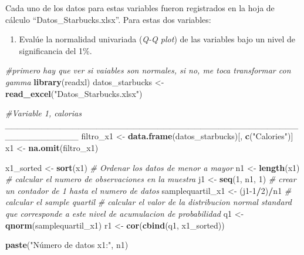 \documentclass[
]{article}
\newenvironment{Shaded}{\begin{snugshade}}{\end{snugshade}}
\newcommand{\CommentTok}[1]{\textcolor[rgb]{0.56,0.35,0.01}{\textit{#1}}}
\newcommand{\DecValTok}[1]{\textcolor[rgb]{0.00,0.00,0.81}{#1}}
\newcommand{\FunctionTok}[1]{\textcolor[rgb]{0.13,0.29,0.53}{\textbf{#1}}}
\newcommand{\NormalTok}[1]{#1}
\newcommand{\OtherTok}[1]{\textcolor[rgb]{0.56,0.35,0.01}{#1}}
\newcommand{\SpecialCharTok}[1]{\textcolor[rgb]{0.81,0.36,0.00}{\textbf{#1}}}
\newcommand{\StringTok}[1]{\textcolor[rgb]{0.31,0.60,0.02}{#1}}
\providecommand{\tightlist}{%
  \setlength{\itemsep}{0pt}\setlength{\parskip}{0pt}}
\begin{document}
Cada uno de los datos para estas variables fueron registrados en la hoja
de cálculo ``Datos\_Starbucks.xlsx''. Para estas dos variables:

\begin{enumerate}
\def\labelenumi{\arabic{enumi}.}
\tightlist
\item
  Evalúe la normalidad univariada (\emph{Q-Q plot}) de las variables
  bajo un nivel de significancia del 1\%.
\end{enumerate}

\begin{Shaded}
\begin{Highlighting}[]
\CommentTok{\#primero hay que ver si vaiables son normales, si no, me toca transformar con gamma}
\FunctionTok{library}\NormalTok{(readxl)}
\NormalTok{datos\_starbucks }\OtherTok{\textless{}{-}} \FunctionTok{read\_excel}\NormalTok{(}\StringTok{"Datos\_Starbucks.xlsx"}\NormalTok{)}


\CommentTok{\#Variable 1, calorias  \_\_\_\_\_\_\_\_\_\_\_\_\_\_\_\_\_\_\_\_\_\_\_\_\_\_\_\_\_\_\_\_\_\_\_\_\_\_\_\_\_\_\_\_\_\_\_\_\_\_\_\_\_\_\_\_\_\_\_\_}
\NormalTok{filtro\_x1 }\OtherTok{\textless{}{-}} \FunctionTok{data.frame}\NormalTok{(datos\_starbucks)[, }\FunctionTok{c}\NormalTok{(}\StringTok{"Calories"}\NormalTok{)]}
\NormalTok{x1 }\OtherTok{\textless{}{-}} \FunctionTok{na.omit}\NormalTok{(filtro\_x1)}

\NormalTok{x1\_sorted }\OtherTok{\textless{}{-}} \FunctionTok{sort}\NormalTok{(x1) }\CommentTok{\# Ordenar los datos de menor a mayor}
\NormalTok{n1 }\OtherTok{\textless{}{-}} \FunctionTok{length}\NormalTok{(x1) }\CommentTok{\# calcular el numero de observaciones en la muestra}
\NormalTok{j1 }\OtherTok{\textless{}{-}} \FunctionTok{seq}\NormalTok{(}\DecValTok{1}\NormalTok{, n1, }\DecValTok{1}\NormalTok{) }\CommentTok{\# crear un contador de 1 hasta el numero de datos}
\NormalTok{samplequartil\_x1 }\OtherTok{\textless{}{-}}\NormalTok{ (j1}\DecValTok{{-}1}\SpecialCharTok{/}\DecValTok{2}\NormalTok{)}\SpecialCharTok{/}\NormalTok{n1 }\CommentTok{\# calcular el sample quartil }
\CommentTok{\# calcular el valor de la distribucion normal standard que corresponde a este nivel de acumulacion de probabilidad}
\NormalTok{q1 }\OtherTok{\textless{}{-}} \FunctionTok{qnorm}\NormalTok{(samplequartil\_x1)}
\NormalTok{r1 }\OtherTok{\textless{}{-}} \FunctionTok{cor}\NormalTok{(}\FunctionTok{cbind}\NormalTok{(q1, x1\_sorted))}

\FunctionTok{paste}\NormalTok{(}\StringTok{"Número de datos x1:"}\NormalTok{, n1)}
\end{Highlighting}
\end{Shaded}
\end{document}
